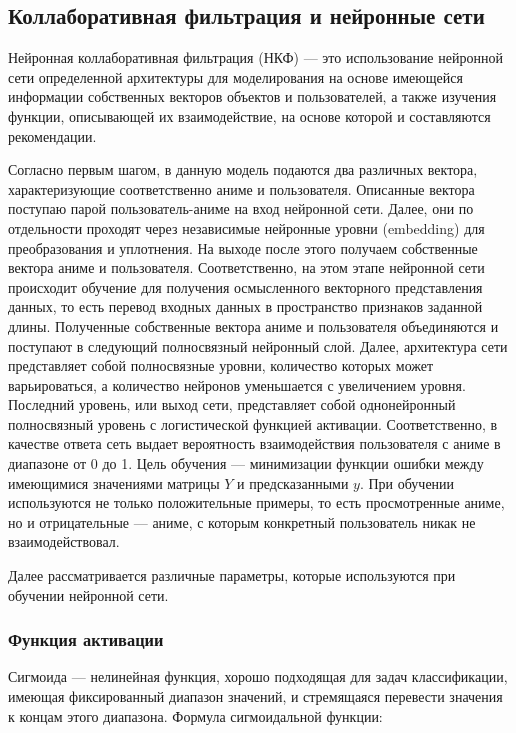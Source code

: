 \documentclass[bachelor, och, diploma]{SCWorks}
\begin{document}
\subsection{Коллаборативная фильтрация и нейронные сети}
Нейронная коллаборативная фильтрация (НКФ) --- это использование нейронной сети определенной архитектуры для моделирования на основе имеющейся информации собственных векторов объектов и пользователей, а также изучения функции, описывающей их взаимодействие, на основе которой и составляются рекомендации.

Согласно \cite{falk2020} первым шагом, в данную модель подаются два различных вектора, 
характеризующие соответственно аниме и пользователя. Описанные вектора поступаю парой пользователь-аниме
 на вход нейронной сети. Далее, они по отдельности проходят через независимые нейронные уровни (embedding) для преобразования и уплотнения.
  На выходе после этого получаем собственные вектора аниме и пользователя. Соответственно, на этом этапе нейронной сети происходит обучение для
   получения осмысленного векторного представления данных, то есть перевод входных данных в пространство признаков заданной длины. Полученные 
   собственные вектора аниме и пользователя объединяются и поступают в следующий полносвязный нейронный слой. Далее, архитектура сети представляет
    собой полносвязные уровни, количество которых может варьироваться, а количество нейронов уменьшается с увеличением уровня. Последний уровень, или выход сети,
	 представляет собой однонейронный полносвязный уровень с логистической функцией активации. Соответственно, в качестве ответа сеть выдает вероятность взаимодействия пользователя с аниме
	  в диапазоне от 0 до 1. Цель обучения --- минимизации функции ошибки между имеющимися значениями матрицы $Y$ и предсказанными $y$. При обучении используются 
	  не только положительные примеры, то есть просмотренные аниме, но и отрицательные --- аниме, с которым конкретный пользователь никак не взаимодействовал.

Далее рассматривается различные параметры, которые используются при обучении нейронной сети. 

\subsubsection{Функция активации}
Сигмоида — нелинейная функция, хорошо подходящая для задач классификации, имеющая фиксированный диапазон значений, и стремящаяся перевести значения к концам этого диапазона. Формула сигмоидальной функции: 
\end{document}
